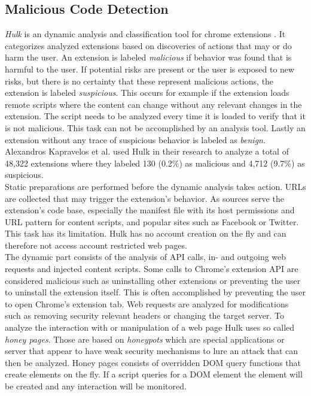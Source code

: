 		
	\subsection{Malicious Code Detection} 
	
		\textit{Hulk} is an dynamic analysis and classification tool for chrome extensions \cite{184485}. It categorizes analyzed extensions based on discoveries of actions that may or do harm the user. An extension is labeled \textit{malicious} if behavior was found that is harmful to the user. If potential risks are present or the user is exposed to new risks, but there is no certainty that these represent malicious actions, the extension is labeled \textit{suspicious}. This occurs for example if the extension loads remote scripts where the content can change without any relevant changes in the extension. The script needs to be analyzed every time it is loaded to verify that it is not malicious. This task can not be accomplished by an analysis tool. Lastly an extension without any trace of suspicious behavior is labeled as \textit{benign}. Alexandros Kapravelos et al. used Hulk in their research to analyze a total of 48,322 extensions where they labeled 130 (0.2\%) as malicious and 4,712 (9.7\%) as suspicious. \\
		Static preparations are performed before the dynamic analysis takes action. URLs are collected that may trigger the extension's behavior. As sources serve the extension's code base, especially the manifest file with its host permissions and URL pattern for content scripts, and popular sites such as Facebook or Twitter. This task has its limitation. Hulk has no account creation on the fly and can therefore not access account restricted web pages. \\
		The dynamic part consists of the analysis of API calls, in- and outgoing web requests and injected content scripts. Some calls to Chrome's extension API are considered malicious such as uninstalling other extensions or preventing the user to uninstall the extension itself. This is often accomplished by preventing the user to open Chrome's extension tab. Web requests are analyzed for modifications such as removing security relevant headers or changing the target server. To analyze the interaction with or manipulation of a web page Hulk uses so called \textit{honey pages}. Those are based on \textit{honeypots} which are special applications or server that appear to have weak security mechanisms to lure an attack that can then be analyzed. Honey pages consists of overridden DOM query functions that create elements on the fly. If a script queries for a DOM element the element will be created and any interaction will be monitored. \\
		
